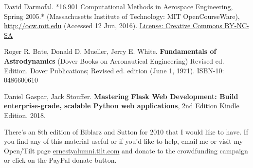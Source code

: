 \documentclass[10pt]{amsart}
\begin{document}
\begin{thebibliography}{9}
  David Darmofal. *16.901 Computational Methods in Aerospace Engineering, Spring 2005.* (Massachusetts Institute of Technology: MIT OpenCourseWare), \url{http://ocw.mit.edu} (Accessed 12 Jun, 2016). \href{http://creativecommons.org/licenses/by-nc-sa/4.0/}{License: Creative Commons BY-NC-SA}

Roger R. Bate, Donald D. Mueller, Jerry E. White. \textbf{Fundamentals of Astrodynamics} (Dover Books on Aeronautical Engineering) Revised ed. Edition. Dover Publications; Revised ed. edition (June 1, 1971). ISBN-10: 0486600610

Daniel Gaspar, Jack Stouffer.
\textbf{Mastering Flask Web Development: Build enterprise-grade, scalable Python web applications}, 2nd Edition Kindle Edition. 2018.

  
\end{thebibliography}
There's an 8th edition of Biblarz and Sutton \cite{GSuttonOBiblarz2001} for 2010 that I would like to have.  If you find any of this material useful or if you'd like to help, email me or visit my Open/Tilt page \url{ernestyalumni.tilt.com} and donate to the crowdfunding campaign or click on the PayPal donate button.  






\clearpage
\onecolumn






\newpage


%
\end{document}
